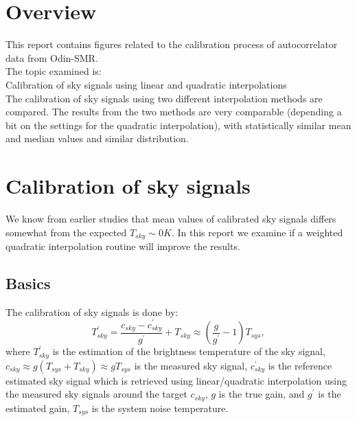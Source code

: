 \section{Overview}
This report contains figures related to the calibration
process of autocorrelator data from Odin-SMR.\\
\newline
The topic examined is:\\
\newline
Calibration of sky signals using linear and quadratic interpolations\\
The calibration of sky signals using two different interpolation
methods are compared.
The results from the two methods are very comparable
(depending a bit on the settings for the quadratic interpolation),
with statistically similar mean and median values
and similar distribution.


\clearpage
\newpage

\section{Calibration of sky signals}
We know from earlier studies that mean values
of calibrated sky signals differs somewhat from 
the expected \(T_{sky}\sim0 K\). In this report we examine
if a weighted quadratic interpolation routine
will improve the results.   



\subsection{Basics}
The calibration of sky signals is done by:
\begin{equation}
\label{eq:skysig}
T^{'}_{sky}=\frac{c_{sky}-c^{'}_{sky}}{g^{'}}+T_{sky}\approx(\frac{g}{g^{'}}-1)T_{sys},
\end{equation}
where \(T^{'}_{sky}\) is the estimation of the brightness temperature
of the sky signal, \(c_{sky}\approx g(T_{sys}+T_{sky})\approx gT_{sys}\) is the measured sky signal,
 \(c^{'}_{sky}\) is the reference estimated sky signal
which is retrieved using linear/quadratic interpolation using
the measured sky signals around the target \(c_{sky}\),   
\(g\) is the true
gain, and \(g^{'}\) is the estimated gain, \(T_{sys}\) is the system
noise temperature.
